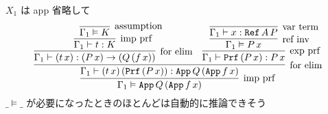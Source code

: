 \(X_1\) は app 省略して
\[
  \infer[\text{imp prf}]
  {\Gamma_1 \vDash \texttt{App} \, Q \, (\texttt{App} \, f \, x)}{
    \infer[\text{for elim}]
    {\Gamma_1 \vdash (t \, x) \, (\texttt{Prf} \, (P \, x)) : \texttt{App} \, Q \, (\texttt{App} \, f \, x)}{
      \infer[\text{for elim}]{\Gamma_1 \vdash (t \, x) : (P \, x) \to (Q \, (f \, x))}{
        \infer[\text{imp prf}]{\Gamma_1 \vdash t : K}{
          \infer[\text{assumption}]{\Gamma_1 \vDash K}{}}
      } &
      \infer[\text{exp prf}]{\Gamma_1 \vdash \texttt{Prf} \, (P \, x) : P \, x}{
        \infer[\text{ref inv}]{\Gamma_1 \vDash P \, x}{
          \infer[\text{var term}]{\Gamma_1 \vdash x : \texttt{Ref} \, A \, P}{}}
    }
    }
  }
\]
\(\_ \vDash \_ \) が必要になったときのほとんどは自動的に推論できそう